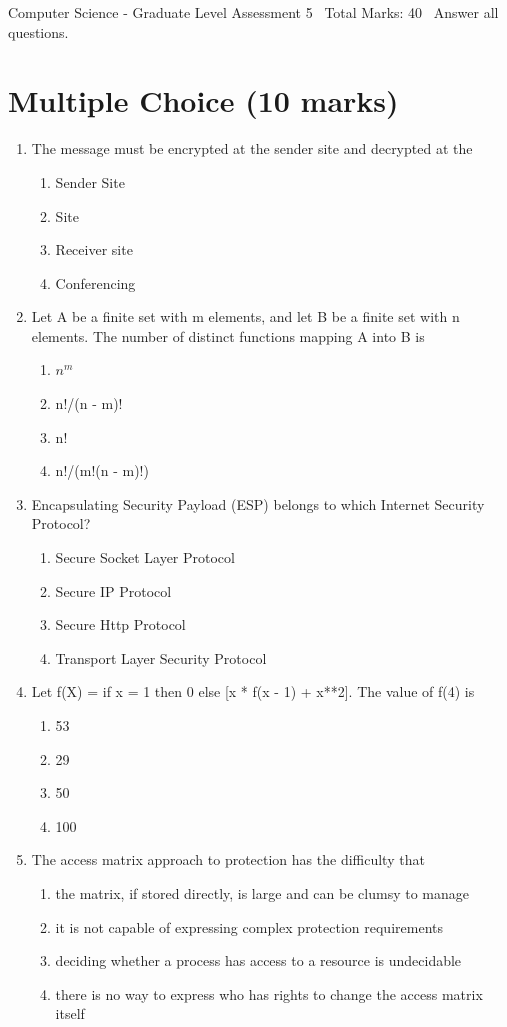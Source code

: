 \documentclass[12pt]{article}
\begin{document}
\begin{center}
Computer Science - Graduate Level Assessment 5 \
Total Marks: 40 \
Answer all questions.
\end{center}

\section*{Multiple Choice (10 marks)}
\begin{enumerate}[label=\arabic*.]
\item The message must be encrypted at the sender site and decrypted at the
\begin{enumerate}[label=(\alph*)]
    \item Sender Site
    \item Site
    \item Receiver site
    \item Conferencing
\end{enumerate}
\item Let A be a finite set with m elements, and let B be a finite set with n elements. The number of distinct functions mapping A into B is
\begin{enumerate}[label=(\alph*)]
    \item $n^m$
    \item n!/(n - m)!
    \item n!
    \item n!/(m!(n - m)!)
\end{enumerate}
\item Encapsulating Security Payload (ESP) belongs to which Internet Security Protocol?
\begin{enumerate}[label=(\alph*)]
    \item Secure Socket Layer Protocol
    \item Secure IP Protocol
    \item Secure Http Protocol
    \item Transport Layer Security Protocol
\end{enumerate}
\item Let f(X) = if x = 1 then 0 else [x * f(x - 1) + x**2]. The value of f(4) is
\begin{enumerate}[label=(\alph*)]
    \item 53
    \item 29
    \item 50
    \item 100
\end{enumerate}
\item The access matrix approach to protection has the difficulty that
\begin{enumerate}[label=(\alph*)]
    \item the matrix, if stored directly, is large and can be clumsy to manage
    \item it is not capable of expressing complex protection requirements
    \item deciding whether a process has access to a resource is undecidable
    \item there is no way to express who has rights to change the access matrix itself
\end{enumerate}
\end{enumerate}
\end{document}
